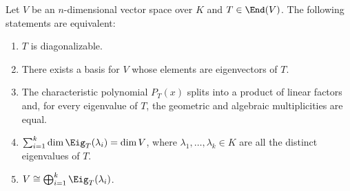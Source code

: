 \begin{theorem}\label{thm:diag_equiv}
  Let $V$ be an $n$-dimensional vector space over $K$ and $T \in \End(V)$. The following statements are equivalent:
  \begin{enumerate}
    \item[\textbf{(a)}] $T$ is diagonalizable.
    \item[\textbf{(b)}] There exists a basis for $V$ whose elements are eigenvectors of $T$.
    \item[\textbf{(c)}] The characteristic polynomial $P_T(x)$ splits into a product of linear factors and, for every eigenvalue of $T$, the geometric and algebraic multiplicities are equal.
    \item[\textbf{(d)}] $\sum_{i=1}^k \dim \Eig_T(\lambda_i) = \dim V$, where $\lambda_1, \dots, \lambda_k \in K$ are all the distinct eigenvalues of $T$.
    \item[\textbf{(e)}] $V \cong \bigoplus_{i=1}^k \Eig_T(\lambda_i)$.
  \end{enumerate}
\end{theorem}

